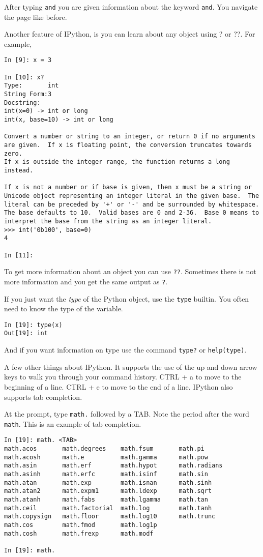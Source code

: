 \documentclass[12pt]{article}
\begin{document}
After typing \texttt{and} you are given information about the keyword \texttt{and}. You navigate the page like before.

Another feature of IPython, is you can learn about any object using ? or ??. For example,

\begin{lstlisting}[style=bash]
In [9]: x = 3

In [10]: x?
Type:       int
String Form:3
Docstring:
int(x=0) -> int or long
int(x, base=10) -> int or long

Convert a number or string to an integer, or return 0 if no arguments
are given.  If x is floating point, the conversion truncates towards zero.
If x is outside the integer range, the function returns a long instead.

If x is not a number or if base is given, then x must be a string or
Unicode object representing an integer literal in the given base.  The
literal can be preceded by '+' or '-' and be surrounded by whitespace.
The base defaults to 10.  Valid bases are 0 and 2-36.  Base 0 means to
interpret the base from the string as an integer literal.
>>> int('0b100', base=0)
4

In [11]: 
\end{lstlisting}

To get more information about an object you can use \texttt{??}. Sometimes there is not more information and you get the same output as \texttt{?}. 

If you just want the \emph{type} of the Python object, use the \texttt{type} builtin. You often need to know the type of the variable.

\begin{lstlisting}[style=bash]
In [19]: type(x)
Out[19]: int
\end{lstlisting}

And if you want information on type use the command \texttt{type?} or \texttt{help(type)}.

A few other things about IPython. It supports the use of the up and down arrow keys to walk you through your command history. CTRL + a to move to the beginning of a line. CTRL + e to move to the end of a line. IPython also supports tab completion.

At the prompt, type \texttt{math.} followed by a TAB. Note the period after the word \texttt{math}. This is an example of tab completion.

\begin{lstlisting}[style=bash]
In [19]: math. <TAB>
math.acos       math.degrees    math.fsum       math.pi
math.acosh      math.e          math.gamma      math.pow
math.asin       math.erf        math.hypot      math.radians
math.asinh      math.erfc       math.isinf      math.sin
math.atan       math.exp        math.isnan      math.sinh
math.atan2      math.expm1      math.ldexp      math.sqrt
math.atanh      math.fabs       math.lgamma     math.tan
math.ceil       math.factorial  math.log        math.tanh
math.copysign   math.floor      math.log10      math.trunc
math.cos        math.fmod       math.log1p      
math.cosh       math.frexp      math.modf       

In [19]: math.
\end{lstlisting}
\end{document}
